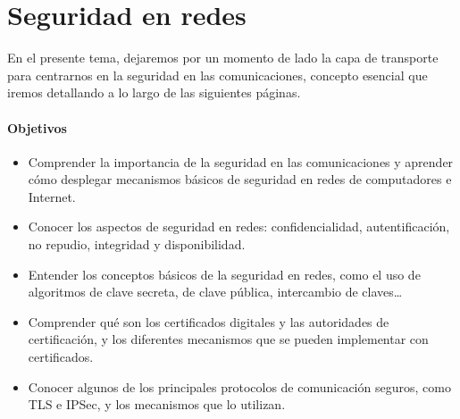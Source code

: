 \chapter{Seguridad en redes}

En el presente tema, dejaremos por un momento de lado la capa de transporte para centrarnos en la seguridad en las comunicaciones, concepto esencial que iremos detallando a lo largo de las siguientes páginas.

\subsubsection{Objetivos}
\begin{itemize}
    \item Comprender la importancia de la seguridad en las comunicaciones y aprender cómo desplegar mecanismos básicos de seguridad en redes de computadores e Internet.
    \item Conocer los aspectos de seguridad en redes: confidencialidad, autentificación, no repudio, integridad y disponibilidad. 
    \item Entender los conceptos básicos de la seguridad en redes, como el uso de algoritmos de clave secreta, de clave pública, intercambio de claves\ldots
    \item Comprender qué son los certificados digitales y las autoridades de certificación, y los diferentes mecanismos que se pueden implementar con certificados. 
    \item Conocer algunos de los principales protocolos de comunicación seguros, como \acrshort{TLS} e \acrshort{IPSec}, y los mecanismos que lo utilizan. 
\end{itemize}


